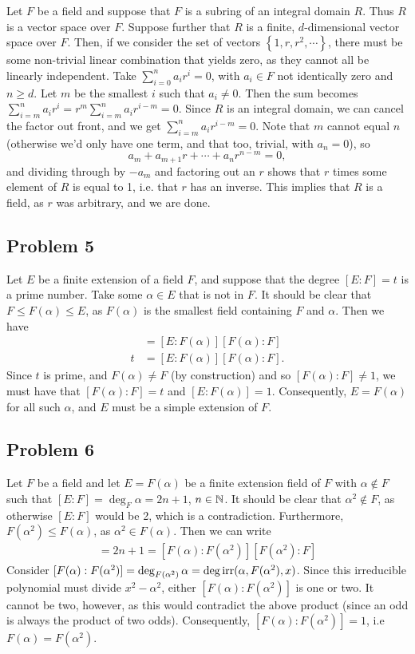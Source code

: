 \documentclass{../../mathnotes}
\begin{document}
Let $F$ be a field and suppose that $F$ is a subring of an integral domain $R$. Thus $R$ is a vector space over $F$.
Suppose further that $R$ is a finite, $d$-dimensional vector space over $F$. Then, if we consider the set of vectors
$\left\{ 1,r,r^2,\cdots \right\}$, there must be some non-trivial linear combination that yields zero, as they
cannot all be linearly independent. Take $\sum_{i=0}^na_ir^i=0$, with $a_i\in F$ not identically zero and $n\geq d$.
Let $m$ be the smallest $i$ such that $a_i\neq 0$. Then the sum becomes
$\sum_{i=m}^na_ir^i=r^m\sum_{i=m}^na_ir^{i-m}=0$. Since $R$ is an integral domain, we can cancel the factor out front,
and we get $\sum_{i=m}^na_ir^{i-m}=0$. Note that $m$ cannot equal $n$ (otherwise we'd only have one term, and that too,
trivial, with $a_n=0$), so
\[a_m+a_{m+1}r+\cdots+a_nr^{n-m}=0,\]
and dividing through by $-a_m$ and factoring out an $r$ shows that $r$ times some element of $R$ is equal to 1, i.e.
that $r$ has an inverse. This implies that $R$ is a field, as $r$ was arbitrary, and we are done.

\subsection*{Problem 5}

Let $E$ be a finite extension of a field $F$, and suppose that the degree $[E:F]=t$ is a prime number. Take some
$\alpha\in E$ that is not in $F$. It should be clear that $F\leq F(\alpha)\leq E$, as $F(\alpha)$ is the smallest
field containing $F$ and $\alpha$. Then we have
\begin{align*}
    [E:F]&=[E:F(\alpha)][F(\alpha):F]\\
    t&=[E:F(\alpha)][F(\alpha):F].
\end{align*}
Since $t$ is prime, and $F(\alpha)\neq F$ (by construction) and so $[F(\alpha):F]\neq1$, we must have that
$[F(\alpha):F]=t$ and $[E:F(\alpha)]=1$. Consequently, $E=F(\alpha)$ for all such $\alpha$, and $E$ must be a simple
extension of $F$.

\subsection*{Problem 6}

Let $F$ be a field and let $E=F(\alpha)$ be a finite extension field of $F$ with $\alpha\notin F$ such that $[E:F]=\deg_F\alpha=2n+1$,
$n\in\mathbb{N}$. It should be clear that $\alpha^2\notin F$, as otherwise $[E:F]$ would be 2, which is a contradiction. Furthermore,
$F(\alpha^2)\leq F(\alpha)$, as $\alpha^2\in F(\alpha)$. Then we can write
\begin{align*}
    [F(\alpha):F]=2n+1=[F(\alpha):F(\alpha^2)][F(\alpha^2):F]
\end{align*}
Consider $[F(\alpha):F(\alpha^2)]=\deg_{F(\alpha^2)}\alpha=\deg\operatorname{irr}(\alpha,F(\alpha^2),x)$. Since this irreducible
polynomial must divide $x^2-\alpha^2$, either $[F(\alpha):F(\alpha^2)]$ is one or two. It cannot be two, however, as
this would contradict the above product (since an odd is always the product of two odds). Consequently, $[F(\alpha):F(\alpha^2)]=1$,
i.e $F(\alpha)=F(\alpha^2)$.
\end{document}
